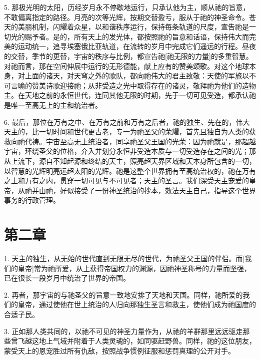 5. 那极光明的太阳，历经岁月永不停歇地运行，只承认他为主，顺从祂的旨意，不敢偏离指定的路径。月亮的次等光辉，按期交替盈亏，服从于祂的神圣命令。苍天的美丽机制，闪耀着众星，以和谐秩序运行，保持每条轨道的尺度，宣告祂是一切光的赐予者。是的，所有天上的发光体，都按照祂的旨意和话语，保持伟大而完美的运动统一，追寻埃塞俄比亚轨道，在流转的岁月中完成它们遥远的行程。昼夜的交替，季节的更替，宇宙的秩序与比例，都宣告祂[祂无限的力量]的多重智慧。对祂而言，那在空间伸展中运行的无形德能，献上应有的赞美颂歌。对这个地球本身，对上面的诸天，对天穹之外的歌队，都向祂伟大的君主致敬：天使的军旅以不可言喻的赞美诗歌迎接祂；从非受造之光中取得存在的诸灵，敬拜祂为他们的造物主。在天地之前的永恒世代，连同其他无限的时期，先于一切可见受造，都承认祂是唯一至高无上的主和统治者。\par

6. 最后，那位在万有之中、在万有之前和万有之后者，祂的独生、先在的，伟大天主的，比一切时间和世代更古老，专一为祂圣父的荣耀，首先且独自为人类的获救向祂代祷。宇宙至高无上统治者，同享祂圣父王国的光荣：因为祂就是，那超越宇宙，环绕圣父的位格，介入并划分永恒非受造本质与一切受造存在之间的光；那从上流下，源自不知起源和终结的天主，照亮超天界区域和天本身所包含的一切，以智慧的光辉明亮远超太阳的光辉。祂是这整个世界拥有至高统治权的，祂在万有之上和万有之内，贯穿一切可见与不可见者；天主的圣言。我们深受天主宠爱的皇帝，从祂并由祂，好似接受了一份神圣统治的抄本，效法天主自己，指导这个世界事务的行政管理。\par


\section{第二章}

1. 天主的独生，从无始的世代直到无限无尽的世代，为祂圣父王国的伴侣。而[我们的皇帝]常为祂所爱，从上获得帝国权力的渊源，因祂神圣称号的力量而坚强，已在很长一段岁月中统治了世界的帝国。\par

2. 再者，那宇宙的与祂圣父的旨意一致地安排了天地和天国。同样，祂所爱的我们的皇帝，通过使他在世上统治的人归向那独生圣言和救主，使他们成为祂国度的合适子民。\par

3. 正如那人类共同的，以祂不可见的神圣力量作为，从祂的羊群那里远远驱走那些曾飞越这地上气域并附着于人类灵魂的，如同驱赶野兽。同样，祂的这位朋友，蒙受天上的恩宠胜过所有仇敌，按照战争惯例征服和惩罚真理的公开对手。\par

